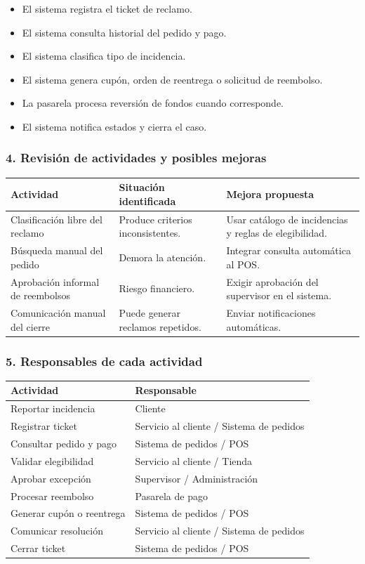 \documentclass[a4paper,12pt]{article}
\begin{document}
\begin{itemize}
    \item El sistema registra el ticket de reclamo.
    \item El sistema consulta historial del pedido y pago.
    \item El sistema clasifica tipo de incidencia.
    \item El sistema genera cupón, orden de reentrega o solicitud de reembolso.
    \item La pasarela procesa reversión de fondos cuando corresponde.
    \item El sistema notifica estados y cierra el caso.
\end{itemize}

\subsubsection*{4. Revisión de actividades y posibles mejoras}

\begin{longtable}{P{5cm} P{4cm} P{5cm}}
\toprule
\textbf{Actividad} & \textbf{Situación identificada} & \textbf{Mejora propuesta} \\
\midrule
Clasificación libre del reclamo & Produce criterios inconsistentes. & Usar catálogo de incidencias y reglas de elegibilidad. \\
Búsqueda manual del pedido & Demora la atención. & Integrar consulta automática al POS. \\
Aprobación informal de reembolsos & Riesgo financiero. & Exigir aprobación del supervisor en el sistema. \\
Comunicación manual del cierre & Puede generar reclamos repetidos. & Enviar notificaciones automáticas. \\
\bottomrule
\end{longtable}

\subsubsection*{5. Responsables de cada actividad}

\begin{longtable}{P{7cm} P{7cm}}
\toprule
\textbf{Actividad} & \textbf{Responsable} \\
\midrule
Reportar incidencia & Cliente \\
Registrar ticket & Servicio al cliente / Sistema de pedidos \\
Consultar pedido y pago & Sistema de pedidos / POS \\
Validar elegibilidad & Servicio al cliente / Tienda \\
Aprobar excepción & Supervisor / Administración \\
Procesar reembolso & Pasarela de pago \\
Generar cupón o reentrega & Sistema de pedidos / POS \\
Comunicar resolución & Servicio al cliente / Sistema de pedidos \\
Cerrar ticket & Sistema de pedidos / POS \\
\bottomrule
\end{longtable}
\end{document}
